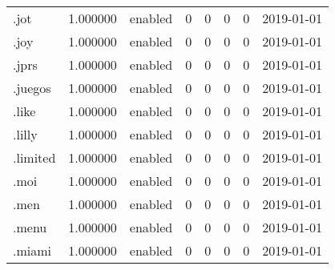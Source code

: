 \begin{tabular}{lrlrrrrl}
.jot                      &          1.000000 &         enabled &                           0 &                           0 &                           0 &                   0 &           2019-01-01 \\
.joy                      &          1.000000 &         enabled &                           0 &                           0 &                           0 &                   0 &           2019-01-01 \\
.jprs                     &          1.000000 &         enabled &                           0 &                           0 &                           0 &                   0 &           2019-01-01 \\
.juegos                   &          1.000000 &         enabled &                           0 &                           0 &                           0 &                   0 &           2019-01-01 \\
.like                     &          1.000000 &         enabled &                           0 &                           0 &                           0 &                   0 &           2019-01-01 \\
.lilly                    &          1.000000 &         enabled &                           0 &                           0 &                           0 &                   0 &           2019-01-01 \\
.limited                  &          1.000000 &         enabled &                           0 &                           0 &                           0 &                   0 &           2019-01-01 \\
.moi                      &          1.000000 &         enabled &                           0 &                           0 &                           0 &                   0 &           2019-01-01 \\
.men                      &          1.000000 &         enabled &                           0 &                           0 &                           0 &                   0 &           2019-01-01 \\
.menu                     &          1.000000 &         enabled &                           0 &                           0 &                           0 &                   0 &           2019-01-01 \\
.miami                    &          1.000000 &         enabled &                           0 &                           0 &                           0 &                   0 &           2019-01-01 \\

\end{tabular}
